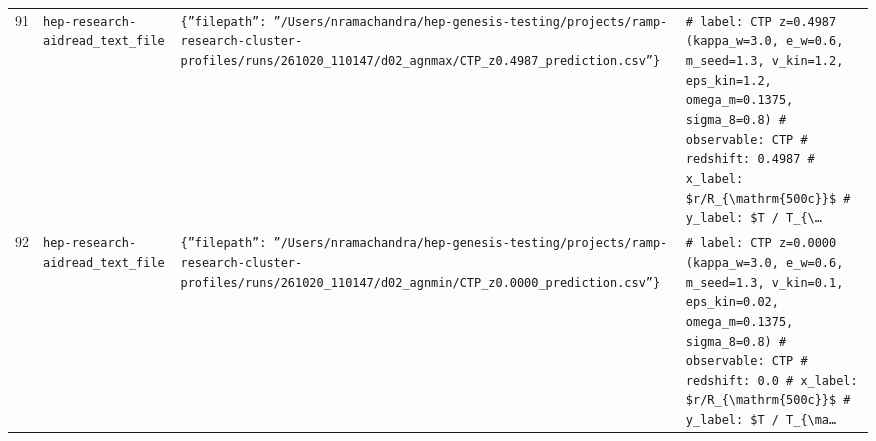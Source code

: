 \documentclass[11pt,a4paper]{article}
\begin{document}
\begin{longtable}{@{}p{}p{}p{}p{}@{}}
91 & \texttt{hep-research-aid}\newline\texttt{read\_\allowbreak{}text\_\allowbreak{}file} & \texttt{\{''filepath'':\allowbreak{} ''/\allowbreak{}Users/\allowbreak{}nramachandra/\allowbreak{}hep-genesis-testing/\allowbreak{}projects/\allowbreak{}ramp-research-cluster-profiles/\allowbreak{}runs/\allowbreak{}261020\_\allowbreak{}110147/\allowbreak{}d02\_\allowbreak{}agnmax/\allowbreak{}CTP\_\allowbreak{}z0.4987\_\allowbreak{}prediction.csv''\}\allowbreak{}} & \texttt{\# label:\allowbreak{} CTP z=\allowbreak{}0.4987 (kappa\_\allowbreak{}w=\allowbreak{}3.0,\allowbreak{} e\_\allowbreak{}w=\allowbreak{}0.6,\allowbreak{} m\_\allowbreak{}seed=\allowbreak{}1.3,\allowbreak{} v\_\allowbreak{}kin=\allowbreak{}1.2,\allowbreak{} eps\_\allowbreak{}kin=\allowbreak{}1.2,\allowbreak{} omega\_\allowbreak{}m=\allowbreak{}0.1375,\allowbreak{} sigma\_\allowbreak{}8=\allowbreak{}0.8)\allowbreak{} \# observable:\allowbreak{} CTP \# redshift:\allowbreak{} 0.4987 \# x\_\allowbreak{}label:\allowbreak{} \$r/\allowbreak{}R\_\allowbreak{}\{\textbackslash{}\allowbreak{}mathrm\{500c\}\allowbreak{}\}\allowbreak{}\$ \# y\_\allowbreak{}label:\allowbreak{} \$T /\allowbreak{} T\_\allowbreak{}\{\textbackslash{}\allowbreak{}\ldots{}\allowbreak{}} \\
92 & \texttt{hep-research-aid}\newline\texttt{read\_\allowbreak{}text\_\allowbreak{}file} & \texttt{\{''filepath'':\allowbreak{} ''/\allowbreak{}Users/\allowbreak{}nramachandra/\allowbreak{}hep-genesis-testing/\allowbreak{}projects/\allowbreak{}ramp-research-cluster-profiles/\allowbreak{}runs/\allowbreak{}261020\_\allowbreak{}110147/\allowbreak{}d02\_\allowbreak{}agnmin/\allowbreak{}CTP\_\allowbreak{}z0.0000\_\allowbreak{}prediction.csv''\}\allowbreak{}} & \texttt{\# label:\allowbreak{} CTP z=\allowbreak{}0.0000 (kappa\_\allowbreak{}w=\allowbreak{}3.0,\allowbreak{} e\_\allowbreak{}w=\allowbreak{}0.6,\allowbreak{} m\_\allowbreak{}seed=\allowbreak{}1.3,\allowbreak{} v\_\allowbreak{}kin=\allowbreak{}0.1,\allowbreak{} eps\_\allowbreak{}kin=\allowbreak{}0.02,\allowbreak{} omega\_\allowbreak{}m=\allowbreak{}0.1375,\allowbreak{} sigma\_\allowbreak{}8=\allowbreak{}0.8)\allowbreak{} \# observable:\allowbreak{} CTP \# redshift:\allowbreak{} 0.0 \# x\_\allowbreak{}label:\allowbreak{} \$r/\allowbreak{}R\_\allowbreak{}\{\textbackslash{}\allowbreak{}mathrm\{500c\}\allowbreak{}\}\allowbreak{}\$ \# y\_\allowbreak{}label:\allowbreak{} \$T /\allowbreak{} T\_\allowbreak{}\{\textbackslash{}\allowbreak{}ma\ldots{}\allowbreak{}} \\

\end{longtable}
\end{document}
